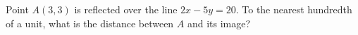 Point $A(3,3)$ is reflected over the line $2x-5y=20$. To the nearest hundredth of a unit, what is the distance between $A$ and its image?
